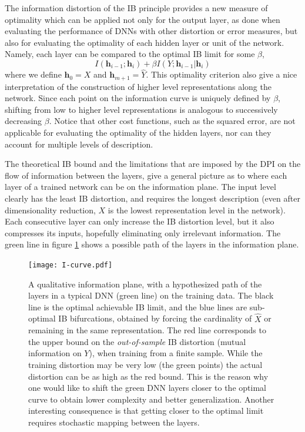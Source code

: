 \documentclass[11pt]{article}
\begin{document}
{The information distortion of the IB principle provides a new measure of optimality
which can be applied not only for the output layer, as done
when evaluating the performance of DNNs with other distortion or error measures, 
but also for evaluating the optimality of each hidden layer or unit of the network.
Namely, each layer can be compared to the optimal
IB limit for some $\beta$, 
\[
I\left(\mathbf{h}_{i-1};\mathbf{h}_{i}\right)+\beta I\left(Y;\mathbf{h}_{i-1}|\mathbf{h}_{i}\right)
\]
where we define $\mathbf{h}_{0}=X$ and $\mathbf{h}_{m+1}=\hat{Y}$.
This optimality criterion also give a nice interpretation of the construction
of higher level representations along the network. Since each point
on the information curve is uniquely defined by $\beta$, shifting
from low  to higher level representations is
analogous to successively decreasing $\beta$.  Notice that other
cost functions, such as the squared error, are not applicable for
evaluating the optimality of the hidden layers, nor can they account
for multiple levels of description.


The theoretical IB bound and the limitations that are imposed by the DPI on the flow of information between the layers, give a general picture as to where each layer of a trained network can be on the information plane. 
The input level clearly has the least IB distortion, and requires the longest description (even after dimensionality reduction, $X$ is the lowest representation level in the network). Each consecutive layer can only increase the IB distortion level, but it also compresses its inputs, hopefully  eliminating only irrelevant information. 
The green line in figure \ref{fig-info-curve} shows
a possible path of the layers in the information plane.

\begin{figure}[h]
\begin{centering}
\texttt{[image: I-curve.pdf]}
\par\end{centering}
\caption{A qualitative information plane, with a hypothesized path of the layers in a typical DNN (green line) on the training data. The black line is the optimal achievable IB limit, and the blue lines are sub-optimal IB bifurcations, obtained by forcing the cardinality of $\hat{X}$ or remaining in the same representation. The red line corresponds to the upper bound on the {\em out-of-sample} IB distortion (mutual information on $Y$), when training from a finite sample. While the training distortion may be very low (the green points) the actual distortion can be as high as the red bound. This is the reason why
one would like to shift the green DNN layers closer to the optimal curve to obtain lower complexity and better generalization. Another interesting consequence is that getting closer to the optimal limit requires stochastic mapping between the layers. }
\label{fig-info-curve}
\end{figure}
}
\end{document}
